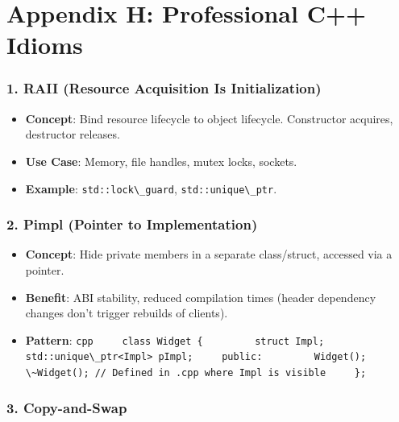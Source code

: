 \hypertarget{appendix-h-professional-c-idioms}{%
\chapter{Appendix H: Professional C++
Idioms}\label{appendix-h-professional-c-idioms}}

\hypertarget{raii-resource-acquisition-is-initialization}{%
\subsection{1. RAII (Resource Acquisition Is
Initialization)}\label{raii-resource-acquisition-is-initialization}}

\begin{itemize}
\tightlist
\item
  \textbf{Concept}: Bind resource lifecycle to object lifecycle.
  Constructor acquires, destructor releases.
\item
  \textbf{Use Case}: Memory, file handles, mutex locks, sockets.
\item
  \textbf{Example}: \passthrough{\lstinline!std::lock\_guard!},
  \passthrough{\lstinline!std::unique\_ptr!}.
\end{itemize}

\hypertarget{pimpl-pointer-to-implementation}{%
\subsection{2. Pimpl (Pointer to
Implementation)}\label{pimpl-pointer-to-implementation}}

\begin{itemize}
\tightlist
\item
  \textbf{Concept}: Hide private members in a separate class/struct,
  accessed via a pointer.
\item
  \textbf{Benefit}: ABI stability, reduced compilation times (header
  dependency changes don't trigger rebuilds of clients).
\item
  \textbf{Pattern}:
  \passthrough{\lstinline!cpp     class Widget \{         struct Impl;         std::unique\_ptr<Impl> pImpl;     public:         Widget();         \~Widget(); // Defined in .cpp where Impl is visible     \};!}
\end{itemize}

\hypertarget{copy-and-swap}{%
\subsection{3. Copy-and-Swap}\label{copy-and-swap}}

